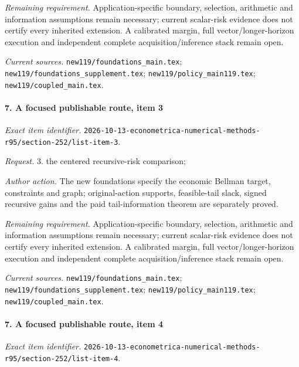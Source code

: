 \par\emph{Remaining requirement.} Application-specific boundary, selection, arithmetic and information assumptions remain necessary; current scalar-risk evidence does not certify every inherited extension. A calibrated margin, full vector/\allowbreak{}longer-horizon execution and independent complete acquisition/\allowbreak{}inference stack remain open.

\par\emph{Current sources.} \nolinkurl{new119/foundations_main.tex}; \nolinkurl{new119/foundations_supplement.tex}; \nolinkurl{new119/policy_main119.tex}; \nolinkurl{new119/coupled_main.tex}.

\paragraph{7. A focused publishable route, item 3}

\emph{Exact item identifier.} \nolinkurl{2026-10-13-econometrica-numerical-methods-r95/section-252/list-item-3}.

\par\emph{Request.} 3. the centered recursive-risk comparison;

\par\emph{Author action.} The new foundations specify the economic Bellman target, constraints and graph; original-action supports, feasible-tail slack, signed recursive gains and the paid tail-information theorem are separately proved.

\par\emph{Remaining requirement.} Application-specific boundary, selection, arithmetic and information assumptions remain necessary; current scalar-risk evidence does not certify every inherited extension. A calibrated margin, full vector/\allowbreak{}longer-horizon execution and independent complete acquisition/\allowbreak{}inference stack remain open.

\par\emph{Current sources.} \nolinkurl{new119/foundations_main.tex}; \nolinkurl{new119/foundations_supplement.tex}; \nolinkurl{new119/policy_main119.tex}; \nolinkurl{new119/coupled_main.tex}.

\paragraph{7. A focused publishable route, item 4}

\emph{Exact item identifier.} \nolinkurl{2026-10-13-econometrica-numerical-methods-r95/section-252/list-item-4}.

